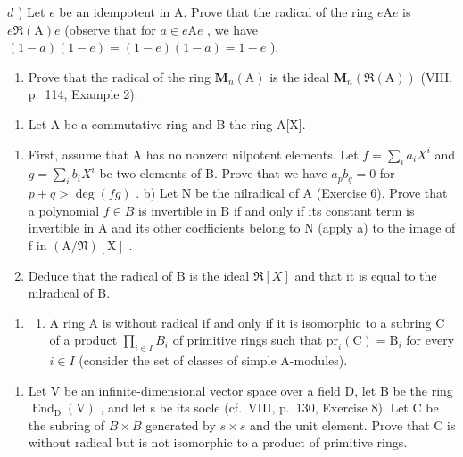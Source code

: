 \(d\) ) Let \(e\) be an idempotent in A. Prove that the radical of the ring \(e\mathrm{A}e\) is \(e\Re (\mathrm{A})e\) (observe that for \(a\in e\mathrm{A}e\) , we have \((1 - a)(1 - e) = (1 - e)(1 - a) = 1 - e\) ).

\begin{enumerate}
\def\labelenumi{\alph{enumi})}
\setcounter{enumi}{4}
\tightlist
\item
  Prove that the radical of the ring \(\mathbf{M}_{n}(\mathrm{A})\) is the ideal \(\mathbf{M}_{n}(\Re(\mathrm{A}))\) (VIII, p.~114, Example 2).
\end{enumerate}

\begin{enumerate}
\def\labelenumi{\arabic{enumi})}
\setcounter{enumi}{10}
\tightlist
\item
  Let A be a commutative ring and B the ring A{[}X{]}.
\end{enumerate}

\begin{enumerate}
\def\labelenumi{\alph{enumi})}
\item
  First, assume that A has no nonzero nilpotent elements. Let \(f = \sum_{i} a_{i} X^{i}\) and \(g = \sum_{i} b_{i} X^{i}\) be two elements of B. Prove that we have \(a_{p} b_{q} = 0\) for \(p + q > \deg(fg)\) . b) Let N be the nilradical of A (Exercise 6). Prove that a polynomial \(f \in B\) is invertible in B if and only if its constant term is invertible in A and its other coefficients belong to N (apply a) to the image of f in \((\mathrm{A}/\mathfrak{N})[\mathrm{X}]\) .
\item
  Deduce that the radical of B is the ideal \(\Re[X]\) and that it is equal to the nilradical of B.
\end{enumerate}

\begin{enumerate}
\def\labelenumi{\arabic{enumi})}
\setcounter{enumi}{11}
\tightlist
\item
  \begin{enumerate}
  \def\labelenumii{\alph{enumii})}
  \tightlist
  \item
    A ring A is without radical if and only if it is isomorphic to a subring C of a product \(\prod_{i\in I}B_{i}\) of primitive rings such that \(\mathrm{pr}_{i}(\mathrm{C})=\mathrm{B}_{i}\) for every \(i\in I\) (consider the set of classes of simple A-modules).
  \end{enumerate}
\end{enumerate}

\begin{enumerate}
\def\labelenumi{\alph{enumi})}
\setcounter{enumi}{1}
\tightlist
\item
  Let V be an infinite-dimensional vector space over a field D, let B be the ring \(\operatorname{End}_{\mathrm{D}}(\mathrm{V})\) , and let s be its socle (cf.~VIII, p.~130, Exercise 8). Let C be the subring of \(B \times B\) generated by \(s \times s\) and the unit element. Prove that C is without radical but is not isomorphic to a product of primitive rings.
\end{enumerate}

